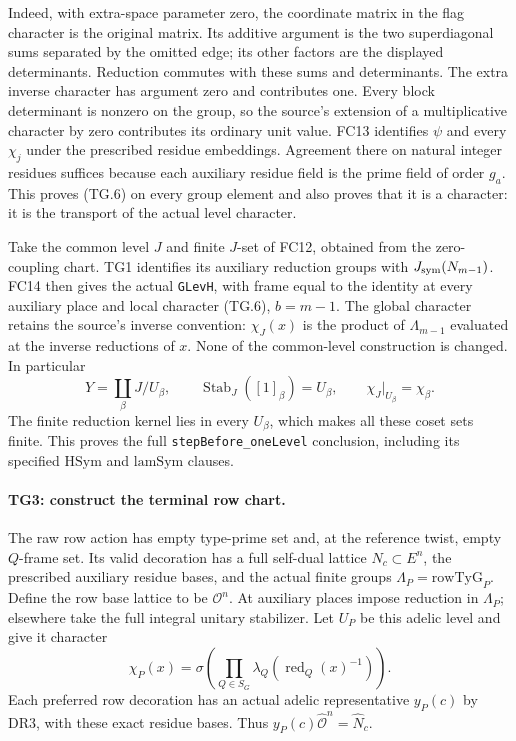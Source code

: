 \documentclass[11pt,a4paper]{article}
\numberwithin{equation}{section}
\theoremstyle{remark}\newtheorem{remark}[theorem]{Remark}
\begin{document}
Indeed, with extra-space parameter zero, the coordinate matrix
in the flag character is the original matrix. Its additive
argument is the two superdiagonal sums separated by the omitted
edge; its other factors are the displayed determinants. Reduction
commutes with these sums and determinants. The extra inverse
character has argument zero and contributes one. Every block
determinant is nonzero on the group, so the source's extension
of a multiplicative character by zero contributes its ordinary
unit value. FC13 identifies $\psi$ and every $\chi_j$ under the
prescribed residue embeddings. Agreement there on natural
integer residues suffices because each auxiliary residue field
is the prime field of order $g_a$. This proves (TG.6) on every
group element and also proves that it is a character: it is the
transport of the actual level character.

Take the common level $J$ and finite $J$-set of FC12, obtained
from the zero-coupling chart. TG1 identifies its auxiliary
reduction groups with $J_{\rm sym}(N_{m-1})$. FC14 then gives
the actual \texttt{GLevH}, with frame equal to the identity at
every auxiliary place and local character (TG.6), $b=m-1$.
The global character retains the source's inverse convention:
$\chi_J(x)$ is the product of $\Lambda_{m-1}$ evaluated at the
inverse reductions of $x$. None of the common-level construction
is changed. In particular
\[
 Y=\coprod_\beta J/U_\beta,\qquad
 \operatorname{Stab}_J([1]_\beta)=U_\beta,
 \qquad \chi_J|_{U_\beta}=\chi_\beta.
 \tag{TG.7}
\]
The finite reduction kernel lies in every $U_\beta$, which makes
all these coset sets finite. This proves the full
\texttt{stepBefore\_\allowbreak oneLevel} conclusion, including its specified
$\mathrm{HSym}$ and $\mathrm{lamSym}$ clauses.

\paragraph{TG3: construct the terminal row chart.}
The raw row action has empty type-prime set and, at the reference
twist, empty $Q$-frame set. Its valid decoration has a full
self-dual lattice $N_c\subset E^n$, the prescribed auxiliary
residue bases, and the actual finite groups
$\Lambda_P=\mathrm{rowTyG}_P$. Define the row base lattice to be
$\mathcal O^n$. At auxiliary places impose reduction in
$\Lambda_P$; elsewhere take the full integral unitary stabilizer.
Let $U_P$ be this adelic level and give it character
\[
 \chi_P(x)=\sigma\!\left(
       \prod_{Q\in S_G}\lambda_Q(\operatorname{red}_Q(x)^{-1})
                         \right).
 \tag{TG.8}
\]
Each preferred row decoration has an actual adelic representative
$y_P(c)$ by DR3, with these exact residue bases. Thus
$y_P(c)\widehat{\mathcal O}^{n}=\widehat N_c$.
\end{document}
